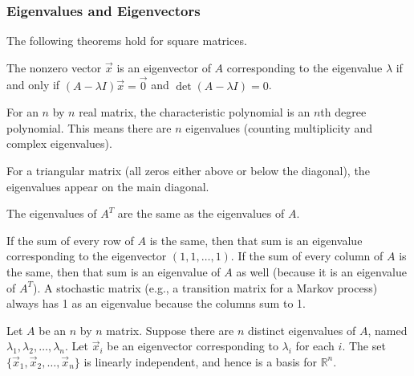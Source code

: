 \subsubsection{Eigenvalues and Eigenvectors}
The following theorems hold for square matrices.

\begin{theorem} \label{thm compute eigen}
The nonzero vector $\vec x$ is an eigenvector of $A$ corresponding to the eigenvalue $\lambda$ if and only if $(A-\lambda I)\vec x=\vec 0$ and $\det(A-\lambda I)=0$.
\end{theorem}

\begin{theorem}\label{thm characteristic degree n}
For an $n$ by $n$ real matrix, the characteristic polynomial is an $n$th degree polynomial. This means there are $n$ eigenvalues (counting multiplicity and complex eigenvalues). 
\end{theorem}

\begin{theorem}\label{thm eigen triangular}
For a triangular matrix (all zeros either above or below the diagonal), the eigenvalues appear on the main diagonal.
\end{theorem}

\begin{theorem}\label{thm eigen transpose}
The eigenvalues of $A^T$ are the same as the eigenvalues of $A$. 
\end{theorem}

\begin{theorem}\label{thm eigenvalues and sums}
If the sum of every row of $A$ is the same, then that sum is an eigenvalue corresponding to the eigenvector $(1,1,\ldots,1)$. 
If the sum of every column of $A$ is the same, then that sum is an eigenvalue of $A$ as well (because it is an eigenvalue of $A^T$). 
A stochastic matrix (e.g., a transition matrix for a Markov process) always has 1 as an eigenvalue because the columns sum to 1. 
\end{theorem}

\begin{theorem}\label{thm independent eigenvectors}
Let $A$ be an $n$ by $n$ matrix.  Suppose there are $n$ distinct eigenvalues of $A$, named $\lambda_1, \lambda_2, \ldots, \lambda_n$. Let $\vec x_i$ be an eigenvector corresponding to $\lambda_i$ for each $i$.  The set $\{\vec x_1,\vec x_2, \ldots,\vec x_n\}$ is linearly independent, and hence is a basis for $\mathbb{R}^n$.
\end{theorem}

